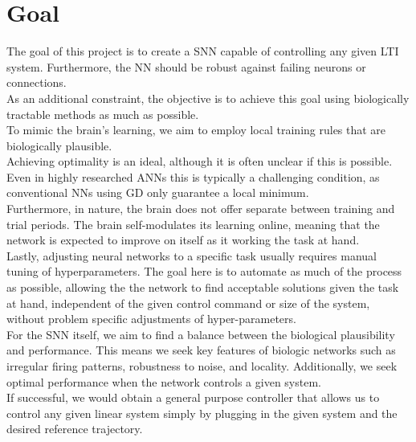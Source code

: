 \section{Goal}\label{sec:goal}
The goal of this project is to create a \ac{SNN} capable of controlling any given \ac{LTI} system. Furthermore, the \ac{NN} should be robust against failing neurons or connections.\\
As an additional constraint, the objective is to achieve this goal using biologically tractable methods as much as possible.\\
To mimic the brain's learning, we aim to employ local training rules that are biologically plausible.\\
Achieving optimality is an ideal, although it is often unclear if this is possible. Even in highly researched \acp{ANN} this is typically a challenging condition, as conventional \acp{NN} using \ac{GD} only guarantee a local minimum.\\
Furthermore, in nature, the brain does not offer separate between training and trial periods. The brain self-modulates its learning online, meaning that the network is expected to improve on itself as it working the task at hand.\\
Lastly, adjusting neural networks to a specific task usually requires manual tuning of hyperparameters. The goal here is to automate as much of the process as possible, allowing the the network to find acceptable solutions given the task at hand, independent of the given control command or size of the system, without problem specific adjustments of hyper-parameters.\\
For the \ac{SNN} itself, we aim to find a balance between the biological plausibility and performance. This means we seek key features of biologic networks such as irregular firing patterns, robustness to noise, and locality. Additionally, we seek optimal performance when the network controls a given system.\\
If successful, we would obtain a general purpose controller that allows us to control any given linear system simply by plugging in the given system and the desired reference trajectory.\\

